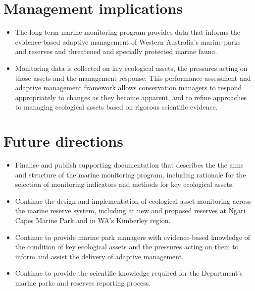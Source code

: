 \documentclass[version=last,
    paper=a4, %
    10pt, %
    usenames,
    dvipsnames,
    oneside, %
    headings=openany, %
    DIV=15 %
]{scrbook}
\begin{document}
\section*{Management implications}
\begin{itemize}
\itemsep1pt\parskip0pt
\item
  The long-term marine monitoring program provides data that informs the
  evidence-based adaptive management of Western Australia's marine parks
  and reserves and threatened and specially protected marine fauna.
\item
  Monitoring data is collected on key ecological assets, the pressures
  acting on those assets and the management response. This performance
  assessment and adaptive management framework allows conservation
  managers to respond appropriately to changes as they become apparent,
  and to refine approaches to managing ecological assets based on
  rigorous scientific evidence.
\end{itemize}



\section*{Future directions}
\begin{itemize}
\itemsep1pt\parskip0pt
\item
  Finalise and publish supporting documentation that describes the the
  aims and structure of the marine monitoring program, including
  rationale for the selection of monitoring indicators and methods for
  key ecological assets.
\item
  Continue the design and implementation of ecological asset monitoring
  across the marine reserve system, including at new and proposed
  reserves at Ngari Capes Marine Park and in WA's Kimberley region.
\item
  Continue to provide marine park managers with evidence-based knowledge
  of the condition of key ecological assets and the pressures acting on
  them to inform and assist the delivery of adaptive management.
\item
  Continue to provide the scientific knowledge required for the
  Department's marine parks and reserves reporting process.
\end{itemize}



\end{document}
